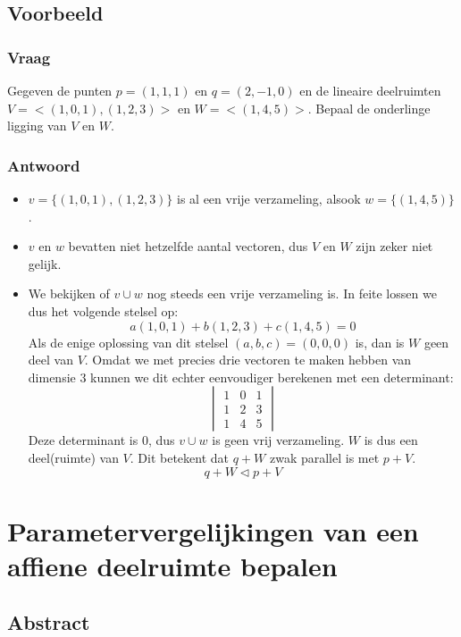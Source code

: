 \documentclass[main.tex]{subfiles}
\begin{document}
\subsection*{Voorbeeld}

\subsubsection*{Vraag}
\begin{center}
  Gegeven de punten $p=(1,1,1)$ en $q=(2,-1,0)$ en de lineaire deelruimten $V=<(1,0,1),(1,2,3)>$ en $W=<(1,4,5)>$. Bepaal de onderlinge ligging van $V$ en $W$.
\end{center}

\subsubsection*{Antwoord}
\begin{itemize}
\item $v=\{(1,0,1),(1,2,3)\}$ is al een vrije verzameling, alsook $w=\{(1,4,5)\}$.
\item $v$ en $w$ bevatten niet hetzelfde aantal vectoren, dus $V$ en $W$ zijn zeker niet gelijk.
\item We bekijken of $v\cup w$ nog steeds een vrije verzameling is.
  In feite lossen we dus het volgende stelsel op:
  \[
  a(1,0,1) + b(1,2,3) + c(1,4,5) = 0
  \]
  Als de enige oplossing van dit stelsel $(a,b,c) = (0,0,0)$ is, dan is $W$ geen deel van $V$.
  Omdat we met precies drie vectoren te maken hebben van dimensie $3$ kunnen we dit echter eenvoudiger berekenen met een determinant:
  \[
  \begin{vmatrix}
    1 & 0 & 1\\
    1 & 2 & 3\\
    1 & 4 & 5
  \end{vmatrix}
  \]
  Deze determinant is $0$, dus $v\cup w$ is geen vrij verzameling. $W$ is dus een deel(ruimte) van $V$.
  Dit betekent dat $q+W$ zwak parallel is met $p+V$.
  \[ q+W \triangleleft p+V \]
\end{itemize}

\newpage
\section{Parametervergelijkingen van een affiene deelruimte bepalen}
\subsection*{Abstract}
\end{document}

